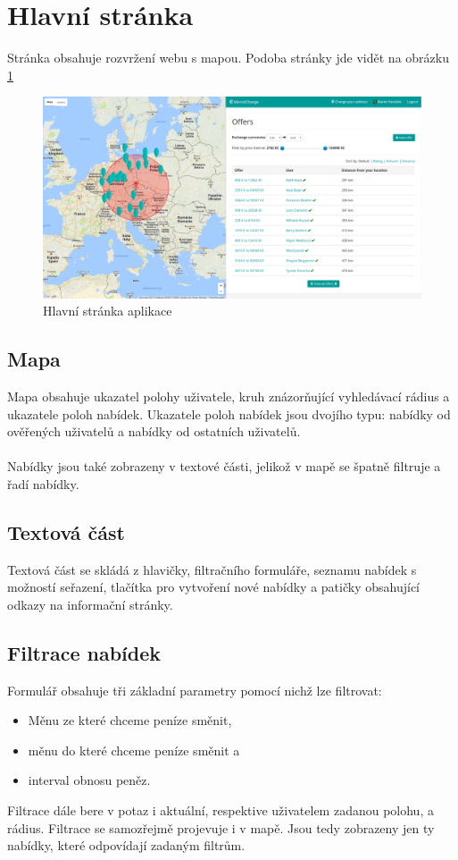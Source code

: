 \section{Hlavní stránka}

\label{nur:homepage}
Stránka obsahuje rozvržení webu s mapou. Podoba stránky jde vidět na obrázku \ref{fig:tur:homepage}

\begin{figure}[h]
    \centering
    \includegraphics[width=1.0\textwidth]{media/tur/homepage.png}
    \caption{Hlavní stránka aplikace}
    \label{fig:tur:homepage}
\end{figure}

\subsection{Mapa}
Mapa obsahuje ukazatel polohy uživatele, kruh znázorňující vyhledávací rádius a ukazatele poloh nabídek. Ukazatele poloh nabídek jsou dvojího typu: nabídky od ověřených uživatelů a nabídky od ostatních uživatelů.
\\\\
Nabídky jsou také zobrazeny v textové části, jelikož v mapě se špatně filtruje a řadí nabídky.

\subsection{Textová část}
Textová část se skládá z hlavičky, filtračního formuláře, seznamu nabídek s možností seřazení, tlačítka pro vytvoření nové nabídky a patičky obsahující odkazy na informační stránky.

\subsection{Filtrace nabídek}
Formulář obsahuje tři základní parametry pomocí nichž lze filtrovat:
\begin{itemize}
	\item Měnu ze které chceme peníze směnit,
	\item měnu do které chceme peníze směnit a
	\item interval obnosu peněz.
\end{itemize}
Filtrace dále bere v potaz i aktuální, respektive uživatelem zadanou polohu, a rádius. Filtrace se samozřejmě projevuje i v mapě. Jsou tedy zobrazeny jen ty nabídky, které odpovídají zadaným filtrům.

